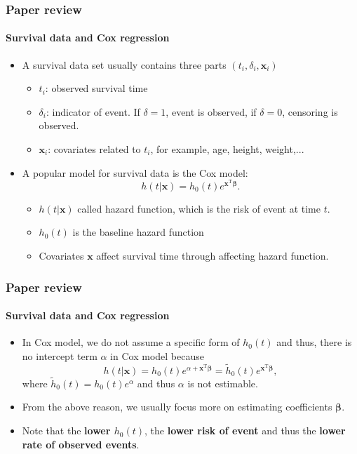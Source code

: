 \documentclass{beamer}
\newcommand{\blue}{\color{blue}}
\newcommand{\bbeta}{\bm{\beta}}
\newcommand{\x}{\bm{x}}
\newcommand{\tp}{^{\mathrm{T}}}
\newcommand{\bhl}[1]{{\blue \textbf{#1}}}
\begin{document}
    \begin{frame}
        \frametitle{Paper review}
        \framesubtitle{Survival data and Cox regression}
        \begin{itemize}
            \item A survival data set usually contains three parts $(t_i,\delta_i,\x_i)$
            \begin{itemize}
                \item $t_i$: observed survival time
                \item $\delta_i$: indicator of event. If $\delta=1$, event is observed, if $\delta=0$, censoring is observed.
                \item $\x_i$: covariates related to $t_i$, for example, age, height, weight,...
            \end{itemize}
        \end{itemize}
        \begin{itemize}
            \item A popular model for survival data is the Cox model:
            \begin{equation*}
                h(t|\x)=h_0(t)e^{\x\tp\bbeta}.
            \end{equation*}
            \begin{itemize}
                \item $h(t|\x)$ called hazard function, which is the risk of event at time $t$.
                \item $h_0(t)$ is the baseline hazard function
                \item Covariates $\x$ affect survival time through affecting hazard function.
            \end{itemize}
        \end{itemize}
    \end{frame}

    \begin{frame}
        \frametitle{Paper review}
        \framesubtitle{Survival data and Cox regression}
        \begin{itemize}
            \item In Cox model, we do not assume a specific form of $h_0(t)$ and thus, there is no intercept term $\alpha$ in Cox model because 
            \begin{equation*}
                h(t|\x)=h_0(t)e^{\alpha+\x\tp\bbeta}=\tilde{h}_0(t)e^{\x\tp\bbeta},
            \end{equation*}
            where $\tilde{h}_0(t)=h_0(t)e^\alpha$ and thus $\alpha$ is not estimable. 
            \item From the above reason, we usually focus more on estimating coefficients $\bbeta$.
            \item Note that the \bhl{lower $h_0(t)$}, the \bhl{lower risk of event} and thus the \bhl{lower rate of observed events}. 
        \end{itemize}
    \end{frame}
\end{document}

